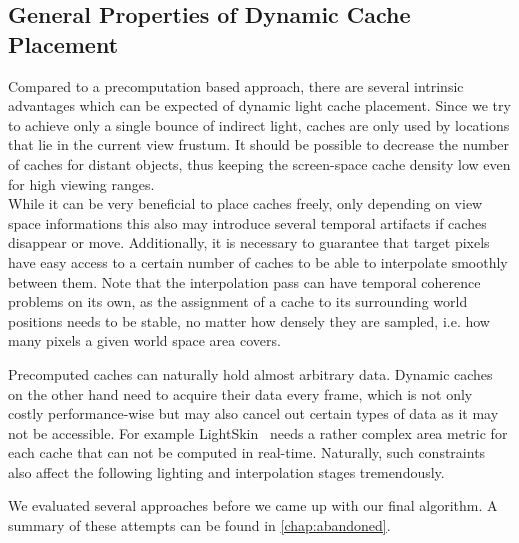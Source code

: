 \documentclass[thesis.tex]{subfiles}
\begin{document}
\subsection{General Properties of Dynamic Cache Placement} \label{sec:impl:dyncacheplace}
Compared to a precomputation based approach, there are several intrinsic advantages which can be expected of dynamic light cache placement.
Since we try to achieve only a single bounce of indirect light, caches are only used by locations that lie in the current view frustum. %
It should be possible to decrease the number of caches for distant objects, thus keeping the screen-space cache density low even for high viewing ranges.
\\
While it can be very beneficial to place caches freely, only depending on view space informations this also may introduce several temporal artifacts if caches disappear or move. %
Additionally, it is necessary to guarantee that target pixels have easy access to a certain number of caches to be able to interpolate smoothly between them.
Note that the interpolation pass can have temporal coherence problems on its own, as the assignment of a cache to its surrounding world positions needs to be stable, no matter how densely they are sampled, i.e. how many pixels a given world space area covers.

Precomputed caches can naturally hold almost arbitrary data. %
Dynamic caches on the other hand need to acquire their data every frame, which is not only costly performance-wise but may also cancel out certain types of data as it may not be accessible.
For example LightSkin~\cite{bib:LightskinPaper} needs a rather complex area metric for each cache that can not be computed in real-time.
Naturally, such constraints also affect the following lighting and interpolation stages tremendously.

We evaluated several approaches before we came up with our final algorithm.
A summary of these attempts can be found in \autoref{chap:abandoned}.
\end{document}
